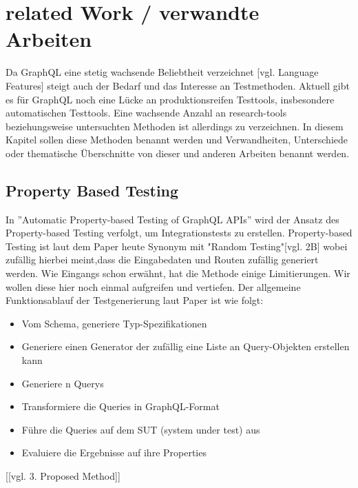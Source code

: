 \chapter{related Work / verwandte Arbeiten}

Da GraphQL eine stetig wachsende Beliebtheit verzeichnet \cite{graphql-growing-report}[vgl. Language Features] steigt auch der Bedarf und das Interesse an Testmethoden.
Aktuell gibt es für GraphQL noch eine Lücke an produktionsreifen Testtools, insbesondere automatischen Testtools.
Eine wachsende Anzahl an research-tools beziehungsweise untersuchten Methoden ist allerdings zu verzeichnen.
In diesem Kapitel sollen diese Methoden benannt werden und Verwandheiten, Unterschiede oder thematische Überschnitte von dieser und anderen Arbeiten benannt werden.

\section{Property Based Testing}

In ''Automatic Property-based Testing of GraphQL APIs''\cite{property-based-testing} wird der Ansatz des Property-based Testing verfolgt, um Integrationstests zu erstellen.
Property-based Testing ist laut dem Paper heute Synonym mit "Random Testing"\cite{property-based-testing}[vgl. 2B] wobei zufällig hierbei meint,dass die Eingabedaten und Routen zufällig generiert werden.
Wie Eingangs schon erwähnt, hat die Methode einige Limitierungen.
Wir wollen diese hier noch einmal aufgreifen und vertiefen.
Der allgemeine Funktionsablauf der Testgenerierung laut Paper ist wie folgt:

\begin{center}
    \begin{itemize}
        \item[1.] Vom Schema, generiere Typ-Spezifikationen
        \item[2.] Generiere einen Generator der zufällig eine Liste an Query-Objekten erstellen kann
        \item[3.] Generiere n Querys
        \item[4.] Transformiere die Queries in GraphQL-Format
        \item[5.] Führe die Queries auf dem SUT (system under test) aus
        \item[6.] Evaluiere die Ergebnisse auf ihre Properties
    \end{itemize}[\cite{property-based-testing}[vgl. 3. Proposed Method]]
\end{center}

